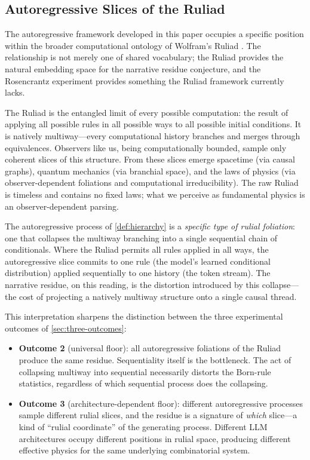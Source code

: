 \documentclass[12pt,a4paper]{article}
\theoremstyle{definition}
\theoremstyle{remark}
\begin{document}
\subsection{Autoregressive Slices of the Ruliad}
\label{sec:ruliad}

The autoregressive framework developed in this paper occupies a
specific position within the broader computational ontology of
Wolfram's Ruliad \citep{Wolfram2020}.  The relationship is not
merely one of shared vocabulary; the Ruliad provides the natural
embedding space for the narrative residue conjecture, and the
Rosencrantz experiment provides something the Ruliad framework
currently lacks.

The Ruliad is the entangled limit of every possible computation:
the result of applying all possible rules in all possible ways to
all possible initial conditions.  It is natively multiway---every
computational history branches and merges through equivalences.
Observers like us, being computationally bounded, sample only
coherent slices of this structure.  From these slices emerge
spacetime (via causal graphs), quantum mechanics (via branchial
space), and the laws of physics (via observer-dependent foliations
and computational irreducibility).  The raw Ruliad is timeless and
contains no fixed laws; what we perceive as fundamental physics is
an observer-dependent parsing.

The autoregressive process of \cref{def:hierarchy} is a
\emph{specific type of rulial foliation}: one that collapses the
multiway branching into a single sequential chain of conditionals.
Where the Ruliad permits all rules applied in all ways, the
autoregressive slice commits to one rule (the model's learned
conditional distribution) applied sequentially to one history (the
token stream).  The narrative residue, on this reading, is the
distortion introduced by this collapse---the cost of projecting a
natively multiway structure onto a single causal thread.

This interpretation sharpens the distinction between the three
experimental outcomes of \cref{sec:three-outcomes}:

\begin{itemize}
  \item \textbf{Outcome 2} (universal floor): all autoregressive
    foliations of the Ruliad produce the same residue.
    Sequentiality itself is the bottleneck.  The act of collapsing
    multiway into sequential necessarily distorts the Born-rule
    statistics, regardless of which sequential process does the
    collapsing.

  \item \textbf{Outcome 3} (architecture-dependent floor): different
    autoregressive processes sample different rulial slices, and the
    residue is a signature of \emph{which} slice---a kind of
    ``rulial coordinate'' of the generating process.  Different LLM
    architectures occupy different positions in rulial space,
    producing different effective physics for the same underlying
    combinatorial system.
\end{itemize}
\end{document}
